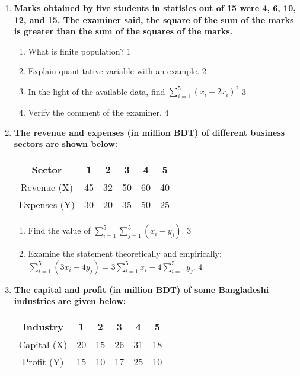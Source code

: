 \documentclass[a4paper,oneside]{book}
\begin{document}
\begin{enumerate}
 \item
	  \textbf{Marks obtained by five students in statisics out of 15 were 4, 6, 10, 12, and 15. The examiner said, the square of the sum of the marks is greater than the sum of the squares of the marks.} 
  
  \begin{enumerate}
    \item
	What is finite population? \hfill 1
    \item
	Explain quantitative variable with an example. \hfill 2
    \item  
	In the light of the available data, find $\displaystyle \sum_{i=1}^5 (x_i-2x_i)^2$ \hfill 3
    \item
	Verify the comment of the examiner. \hfill 4
  \end{enumerate}
  
  \item
\textbf{The revenue and expenses (in million BDT) of different business sectors are shown below:}

\begin{table}[h]
\centering
\begin{tabular}{c|ccccc}
Sector & 1 & 2 & 3 & 4 & 5 \\ \hline
Revenue (X) & 45 & 32 & 50 & 60 & 40 \\ \hline
Expenses (Y) & 30 & 20 & 35 & 50 & 25
\end{tabular}
\end{table}

\begin{enumerate}
    \item  
    Find the value of $\displaystyle \sum_{i=1}^5 \sum_{j=1}^5 (x_i - y_j)$. \hfill 3
    \item
    Examine the statement theoretically and empirically:  $\displaystyle \sum_{i=1}^5 (3x_i - 4y_j) = 3 \sum_{i=1}^5 x_i - 4 \sum_{i=1}^5 y_j$. \hfill 4
\end{enumerate}


   \item
	  \textbf{The capital and profit (in million BDT) of some Bangladeshi 
	  industries are given below:}
	  
	  \begin{table}[h]
	  \centering
\begin{tabular}{c|ccccc}
Industry & 1 & 2 & 3 & 4 & 5 \\ \hline
Capital (X) & 20 & 15 & 26 & 31 & 18 \\ \hline
Profit (Y) & 15 & 10 & 17 & 25 & 10
\end{tabular}
\end{table}
  

\end{enumerate}
\end{document}
